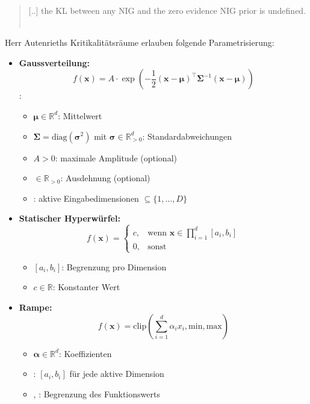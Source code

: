 \begin{otherlanguage}{ngerman}
\begin{quote}
  \glqq{}[..] the KL between any NIG and the zero evidence NIG prior is undefined.\grqq{} \newline ~\parencite[{S. 5, \glqq Minimizing evidence on errors \grqq, Z. 6 ff.}]{amini2020deep}
\end{quote}

Herr Autenrieths Kritikalitätsräume erlauben folgende Parametrisierung: 

\begin{itemize}
  \item \textbf{Gaussverteilung:}
    \[
    f(\mathbf{x}) = A \cdot \exp\left(-\frac{1}{2} (\mathbf{x} - \boldsymbol{\mu})^\top \mathbf{\Sigma}^{-1} (\mathbf{x} - \boldsymbol{\mu}) \right)
    \]
    :
    \begin{itemize}
      \item $\boldsymbol{\mu} \in \mathbb{R}^d$: Mittelwert
      \item $\mathbf{\Sigma} = \mathrm{diag}(\boldsymbol{\sigma}^2)$ mit $\boldsymbol{\sigma} \in \mathbb{R}_{>0}^d$: Standardabweichungen
      \item $A > 0$: maximale Amplitude (optional)
      \item {} $\in \mathbb{R}_{>0}$: Ausdehnung (optional)
      \item {}: aktive Eingabedimensionen $\subseteq \{1, \dots, D\}$
    \end{itemize}

  \item \textbf{Statischer Hyperwürfel:}
    \[
    f(\mathbf{x}) =
    \begin{cases}
      c, & \text{wenn } \mathbf{x} \in \prod_{i=1}^d [a_i, b_i] \\
      0, & \text{sonst}
    \end{cases}
    \]
    \begin{itemize}
      \item $[a_i, b_i]$: Begrenzung pro Dimension
      \item $c \in \mathbb{R}$: Konstanter Wert
    \end{itemize}

  \item \textbf{Rampe:}
    \[
    f(\mathbf{x}) = \mathrm{clip}\left( \sum_{i=1}^d \alpha_i x_i, \text{min}, \text{max} \right)
    \]
    \begin{itemize}
      \item $\boldsymbol{\alpha} \in \mathbb{R}^d$: Koeffizienten
      \item {}: $[a_i, b_i]$ für jede aktive Dimension
      \item {}, : Begrenzung des Funktionswerts
    \end{itemize}


\end{itemize}
\end{otherlanguage}
